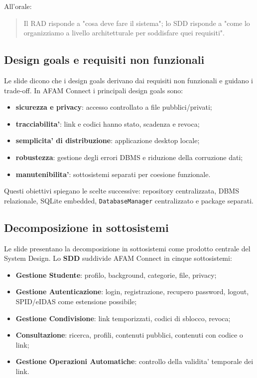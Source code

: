 ﻿\documentclass[11pt,a4paper]{article}
\newcommand{\doc}[1]{\textbf{#1}}
\newcommand{\term}[1]{\textbf{#1}}
\begin{document}
All'orale:
\begin{quote}
Il RAD risponde a "cosa deve fare il sistema"; lo SDD risponde a "come lo
organizziamo a livello architetturale per soddisfare quei requisiti".
\end{quote}

\subsection{Design goals e requisiti non funzionali}

Le slide dicono che i design goals derivano dai requisiti non funzionali e guidano i
trade-off. In AFAM Connect i principali design goals sono:
\begin{itemize}
  \item \term{sicurezza e privacy}: accesso controllato a file pubblici/privati;
  \item \term{tracciabilita'}: link e codici hanno stato, scadenza e revoca;
  \item \term{semplicita' di distribuzione}: applicazione desktop locale;
  \item \term{robustezza}: gestione degli errori DBMS e riduzione della corruzione dati;
  \item \term{manutenibilita'}: sottosistemi separati per coesione funzionale.
\end{itemize}

Questi obiettivi spiegano le scelte successive: repository centralizzata, DBMS relazionale,
SQLite embedded, \texttt{DatabaseManager} centralizzato e package separati.

\subsection{Decomposizione in sottosistemi}

Le slide presentano la decomposizione in sottosistemi come prodotto centrale del System
Design. Lo \doc{SDD} suddivide AFAM Connect in cinque sottosistemi:
\begin{itemize}
  \item \term{Gestione Studente}: profilo, background, categorie, file, privacy;
  \item \term{Gestione Autenticazione}: login, registrazione, recupero password, logout,
  SPID/eIDAS come estensione possibile;
  \item \term{Gestione Condivisione}: link temporizzati, codici di sblocco, revoca;
  \item \term{Consultazione}: ricerca, profili, contenuti pubblici, contenuti con codice
  o link;
  \item \term{Gestione Operazioni Automatiche}: controllo della validita' temporale dei
  link.
\end{itemize}
\end{document}
